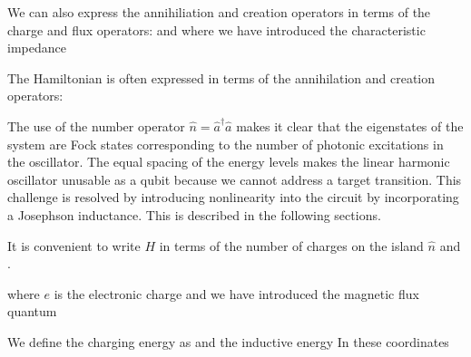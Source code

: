 We can also express the annihiliation and creation operators in terms of the charge and flux operators:
and
where we have introduced the characteristic impedance

The Hamiltonian is often expressed in terms of the annihilation and creation operators:

\noindent
The use of the number operator $\hat{n} = \hat{a}^\dagger \hat{a}$ makes it clear that the eigenstates of the system are Fock states corresponding to the number
of photonic excitations in the oscillator.
The equal spacing of the energy levels makes the linear harmonic oscillator unusable as a qubit because we cannot address a target transition.
This challenge is resolved by introducing nonlinearity into the circuit by incorporating a Josephson inductance.  This is described in the following sections.

It is convenient to write $H$ in terms of the number of charges on the island $\hat{n}$ and .


where $e$ is the electronic charge and we have introduced the magnetic flux quantum

\noindent
We define the charging energy as
and the inductive energy
In these coordinates


